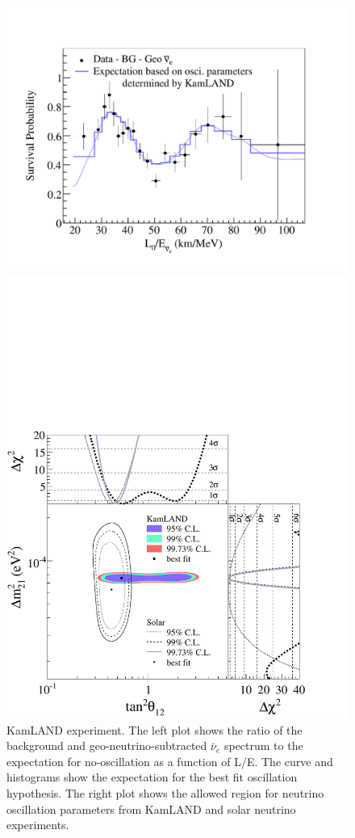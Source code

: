 \begin{figure}[htbp]
\begin{minipage}[c]{.46\linewidth}
   	      \includegraphics[width=0.9\linewidth]{figures/LE.pdf}
   \end{minipage} \hfill
   \begin{minipage}{.46\linewidth}
      \includegraphics[width=0.9\linewidth]{figures/KShape-and-Rate-Tan.pdf}
   \end{minipage}
    \caption{KamLAND experiment. The left plot shows the ratio of the background and geo-neutrino-subtracted $\bar{\nu}_e$
spectrum to the expectation for no-oscillation as a function of
L/E. The curve and histograms show the expectation for the best fit oscillation hypothesis. The right plot shows the allowed region for neutrino oscillation parameters from
KamLAND and solar neutrino experiments.}
 \label{fig:sol-kam}
\end{figure}


